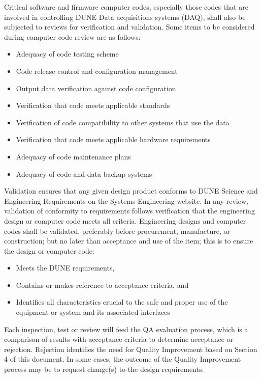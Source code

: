Critical software and firmware computer codes, especially those codes
that are involved in controlling DUNE Data acquisitions systems (DAQ),
shall also be subjected to reviews for verification and
validation. Some items to be considered during computer code review
are as follows:
\begin{itemize}
 \item Adequacy of code testing scheme
 \item Code release control and configuration management
 \item Output data verification against code configuration
 \item Verification that code meets applicable standards
 \item Verification of code compatibility to other systems that use the data
 \item Verification that code meets applicable hardware requirements
 \item Adequacy of code maintenance plans
 \item Adequacy of code and data backup systems
\end{itemize}

Validation ensures that any given design product conforms to DUNE
Science and Engineering Requirements on the Systems Engineering
website. In any review, validation of conformity to requirements
follows verification that the engineering design or computer code
meets all criteria. Engineering designs and computer codes shall be
validated, preferably before procurement, manufacture, or
construction; but no later than acceptance and use of the item; this
is to ensure the design or computer code:
\begin{itemize}
 \item Meets the DUNE requirements,
 \item Contains or makes reference to acceptance criteria, and
 \item Identifies all characteristics crucial to the safe and proper use of the equipment or system and its associated interfaces
\end{itemize}

Each inspection, test or review will feed the QA evaluation process,
which is a comparison of results with acceptance criteria to determine
acceptance or rejection. Rejection identifies the need for Quality
Improvement based on Section 4 of this document. In some cases, the
outcome of the Quality Improvement process may be to request change(s)
to the design requirements.

